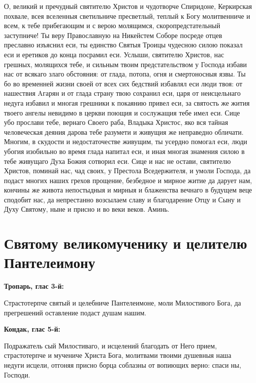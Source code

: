 О, великий и пречудный святителю Христов и чудотворче Спиридоне, Керкирская похвале, всея вселенныя светильниче пресветлый, теплый к Богу молитвенниче и всем, к тебе прибегающим и с верою молящимся, скоропредстательный заступниче! Ты веру Православную на Никейстем Соборе посреде отцев преславно изъяснил еси, ты единство Святыя Троицы чудесною силою показал еси и еретиков до конца посрамил еси. Услыши, святителю Христов, нас грешных, молящихся тебе, и сильным твоим предстательством у Господа избави нас от всякаго злаго обстояния: от глада, потопа, огня и смертоносныя язвы. Ты бо во временней жизни своей от всех сих бедствий избавлял еси люди твоя: от нашествия Aгарян и от глада страну твою сохранил еси, царя от неисцельнаго недуга избавил и многая грешники к покаянию привел еси, за святость же жития твоего ангелы невидимо в церкви поющия и сослужащия тебе имел еси. Сице убо прослави тебе, вернаго Своего раба, Владыка Христос, яко вся тайная человеческая деяния дарова тебе разумети и живущия же неправедно обличати. Многим, в скудости и недостаточестве живущим, ты усердно помогал еси, люди убогия изобильно во время глада напитал еси, и иная многая знамения силою в тебе живущаго Духа Божия сотворил еси. Сице и нас не остави, святителю Христов, поминай нас, чад своих, у Престола Вседержителя, и умоли Господа, да подаст многих наших грехов прощение, безбедное и мирное житие да дарует нам, кончины же живота непостыдныя и мирныя и блаженства вечнаго в будущем веце сподобит нас, да непрестанно возсылаем славу и благодарение Отцу и Сыну и Духу Святому, ныне и присно и во веки веков. Аминь.


\newpage\section{Святому великомученику и целителю Пантелеимону}
 

\bfseries Тропарь, глас 3-й:\normalfont{}\nopagebreak


Страстотерпче святый и целебниче Пантелеимоне, моли Милостивого Бога, да прегрешений оставление подаст душам нашим.


\bfseries  Кондак, глас 5-й:\normalfont{}\nopagebreak


Подражатель сый Милостиваго, и исцелений благодать от Него прием, страстотерпче и мучениче Христа Бога, молитвами твоими душевныя наша недуги исцели, отгоняя присно борца соблазны от вопиющих верно: спаси ны, Господи.


